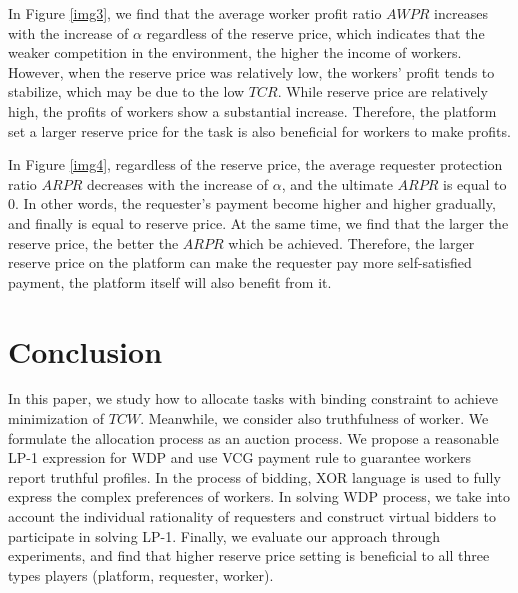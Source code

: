 In Figure \ref{img3}, we find that the average worker profit ratio $AWPR$ increases with the increase of $\alpha$ regardless of the reserve price, which indicates that the weaker competition in the environment, the higher the income of workers. However, when the reserve price was relatively low, the workers' profit tends to stabilize, which may be due to the low $TCR$. While reserve price are relatively high, the profits of workers show a substantial increase. Therefore, the platform set a larger reserve price for the task is also beneficial for workers to make profits.

In Figure \ref{img4}, regardless of the reserve price, the average requester protection ratio $ARPR$ decreases with the increase of $\alpha$, and the ultimate $ARPR$ is equal to 0. In other words, the requester's payment become higher and higher gradually, and finally is equal to reserve price. At the same time, we find that the larger the reserve price, the better the $ARPR$ which be achieved. Therefore, the larger reserve price on the platform can make the requester pay more self-satisfied payment, the platform itself will also benefit from it.
\section{Conclusion}
In this paper, we study how to allocate tasks with binding constraint to achieve minimization of $TCW$. Meanwhile, we consider also truthfulness of worker. We formulate the allocation process as an auction process. We propose a reasonable LP-1 expression for WDP and use VCG payment rule to guarantee workers report truthful profiles. In the process of bidding, XOR language is used to fully express the complex preferences of workers. In solving WDP process, we take into account the individual rationality of requesters and construct virtual bidders to participate in solving LP-1. Finally, we evaluate our approach through experiments, and find that higher reserve price setting is beneficial to all three types players (platform, requester, worker).  